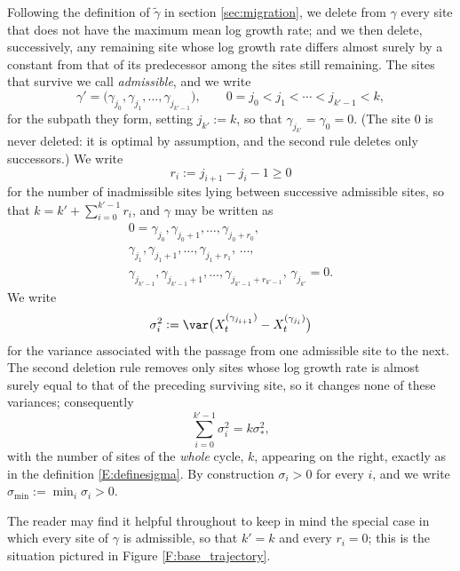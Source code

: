 \documentclass[11pt]{amsart}
\begin{document}
Following the definition of $\tilde\gamma$ in section \ref{sec:migration}, we delete from $\gamma$ every site that does not have the maximum mean log growth rate; and we then delete, successively, any remaining site whose log growth rate differs almost surely by a constant from that of its predecessor among the sites still remaining.
The sites that survive we call {\em admissible}, and we write
$$
\gamma'=\bigl(\gamma_{j_0},\gamma_{j_1},\dots,\gamma_{j_{k'-1}}\bigr), \qquad 0=j_0<j_1<\cdots<j_{k'-1}<k,
$$
for the subpath they form, setting $j_{k'}:=k$, so that $\gamma_{j_{k'}}=\gamma_0=0$.
(The site $0$ is never deleted: it is optimal by assumption, and the second rule deletes only successors.)
We write
$$
r_i:= j_{i+1}-j_i-1 \ge 0
$$
for the number of inadmissible sites lying between successive admissible sites, so that
$k=k'+\sum_{i=0}^{k'-1} r_i$, and $\gamma$ may be written as
\begin{multline*}
	0=\gamma_{j_0},\gamma_{j_0+1},\dots,\gamma_{j_0+r_0},\\
	\gamma_{j_1},\gamma_{j_1+1},\dots,\gamma_{j_1+r_1},\,
	\dots,\\
	\gamma_{j_{k'-1}},\gamma_{j_{k'-1}+1},\dots,\gamma_{j_{k'-1}+r_{k'-1}},\,
	\gamma_{j_{k'}}=0.
\end{multline*}
We write
$$
\sigma_i^2:= \var\bigl(X_t^{(\gamma_{j_{i+1}})} - X_t^{(\gamma_{j_{i}})} \bigr)
$$
for the variance associated with the passage from one admissible site to the next.
The second deletion rule removes only sites whose log growth rate is almost surely equal to that of the preceding surviving site, so it changes none of these variances; consequently
\begin{equation} \label{E:sumsigma}
	\sum_{i=0}^{k'-1} \sigma_i^2 = k \sigma_*^2 ,
\end{equation}
with the number of sites of the {\em whole} cycle, $k$, appearing on the right, exactly as in the definition \eqref{E:definesigma}.
By construction $\sigma_i>0$ for every $i$, and we write $\sigma_{\min}:=\min_i \sigma_i>0$.

The reader may find it helpful throughout to keep in mind the special case in which every site of $\gamma$ is admissible, so that $k'=k$ and every $r_i=0$; this is the situation pictured in Figure \ref{F:base_trajectory}.
\end{document}
